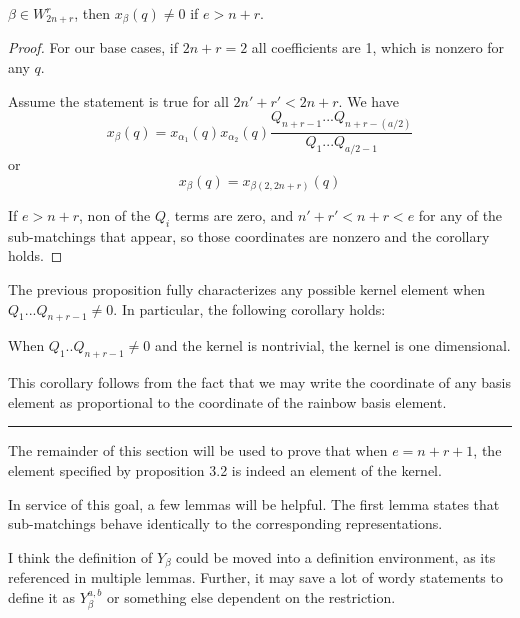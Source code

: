 \documentclass{amsart}
\begin{document}
\vspace{5mm}
\begin{corollary}
	$\beta\in W_{2n+r}^r$, then $x_\beta(q)\not=0$ if $e>n+r$.
\end{corollary}

\begin{proof}
	For our base cases, if $2n+r=2$ all coefficients are 1, which is nonzero for any $q$.
	
	Assume the statement is true for all $2n'+r'<2n+r$. We have $$x_\beta(q)=x_{\alpha_1}(q)x_{\alpha_2}(q)\frac{Q_{n+r-1}...Q_{n+r-(a/2)}}{Q_1...Q_{a/2-1}}$$
	or $$x_\beta(q)=x_{\beta(2,2n+r)}(q)$$
	
	If $e>n+r$, non of the $Q_i$ terms are zero, and $n'+r'<n+r<e$ for any of the sub-matchings that appear, so those coordinates are nonzero and the corollary holds.
	
	
\end{proof}


\vspace{5mm}
The previous proposition fully characterizes any possible kernel element when $Q_1...Q_{n+r-1}\not=0$. In particular, the following corollary holds:

\begin{corollary}
	When $Q_1..Q_{n+r-1}\not=0$ and the kernel is nontrivial, the kernel is one dimensional.
\end{corollary}

This corollary follows from the fact that we may write the coordinate of any basis element as proportional to the coordinate of the rainbow basis element.

\vspace{5mm}
\noindent\rule{16.5cm}{0.4pt}

\vspace{5mm}
The remainder of this section will be used to prove that when $e=n+r+1$, the element specified by proposition 3.2 is indeed an element of the kernel.

In service of this goal, a few lemmas will be helpful. The first lemma states that sub-matchings behave identically to the corresponding representations.

\vspace{5mm}
{\color{magenta} I think the definition of $Y_\beta$ could be moved into a definition environment, as its referenced in multiple lemmas.
Further, it may save a lot of wordy statements to define it as $Y_\beta^{a,b}$ or something else dependent on the restriction.
}
\end{document}
